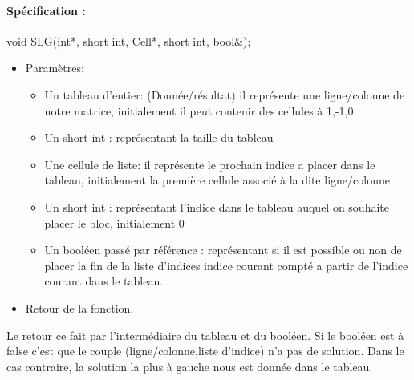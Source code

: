 \documentclass{article}
\begin{document}
\paragraph{Spécification :}
 void SLG(int*, short int, Cell*, short int, bool\&);
\begin{itemize}
\item Paramètres:
\begin{itemize}
\item Un tableau d'entier: (Donnée/résultat) il représente une ligne/colonne de notre matrice, initialement il peut contenir des cellules à 1,-1,0
\item Un short int : représentant la taille du tableau
\item Une cellule de liste: il représente le prochain indice a placer dans le tableau, initialement la première cellule associé à la dite ligne/colonne
\item Un short int : représentant l'indice dans le tableau auquel on souhaite placer le bloc, initialement 0
\item Un booléen passé par référence : représentant si il est possible ou non de placer la fin de la liste d'indices indice courant compté a partir de l'indice courant dans le tableau.
\end{itemize}
\item Retour de la fonction.
\end{itemize}
Le retour ce fait par l'intermédiaire du tableau et du booléen. Si le booléen est à false c'est que le couple (ligne/colonne,liste d'indice) n'a pas de solution. Dans le cas contraire, la solution la plus à gauche nous est donnée dans le tableau.
\end{document}
